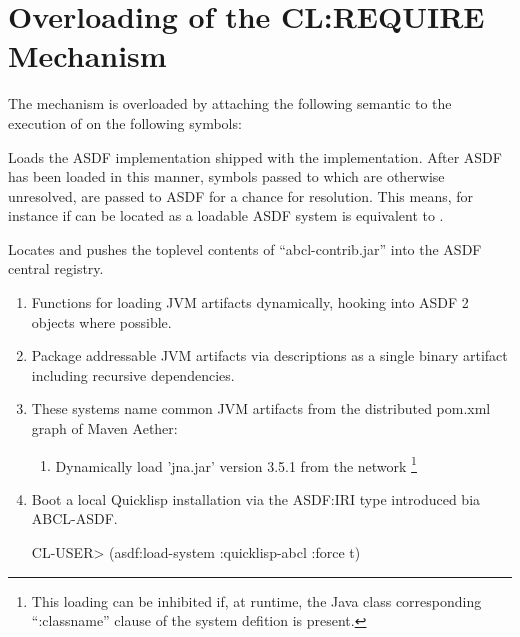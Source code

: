 \documentclass[10pt]{book}
\begin{document}
\section{Overloading of the CL:REQUIRE Mechanism}

The  mechanism is overloaded by attaching the following
semantic to the execution of  on the following symbols:

\begin{description}

  \item{} 
    Loads the \textsc{ASDF} implementation shipped
    with the implementation.  After \textsc{ASDF} has been loaded in
    this manner, symbols passed to  which are
    otherwise unresolved, are passed to ASDF for a chance for
    resolution.  This means, for instance if  can be
    located as a loadable \textsc{ASDF} system  is equivalent to .

  \item{} 
    Locates and pushes the toplevel contents of
    ``abcl-contrib.jar'' into the \textsc{ASDF} central registry.  

    \begin{enumerate}
      \item {} 
        Functions for loading JVM artifacts
        dynamically, hooking into ASDF 2 objects where possible.
      \item {} 
        Package addressable JVM artifacts via
         descriptions as a single binary artifact
        including recursive dependencies.
      \item {} 
        These systems name common JVM artifacts from
        the distributed pom.xml graph of Maven Aether:
        \begin{enumerate}
          \item {} 
            Dynamically load 'jna.jar' version 3.5.1
            from the network \footnote{This loading can be inhibited
              if, at runtime, the Java class corresponding
              ``:classname'' clause of the system defition is present.}
        \end{enumerate}
      \item {} Boot a local Quicklisp installation
        via the ASDF:IRI type introduced bia ABCL-ASDF.

\begin{listing-lisp}
CL-USER> (asdf:load-system :quicklisp-abcl :force t)
\end{listing-lisp}

\end{enumerate}

\end{description}
\end{document}

